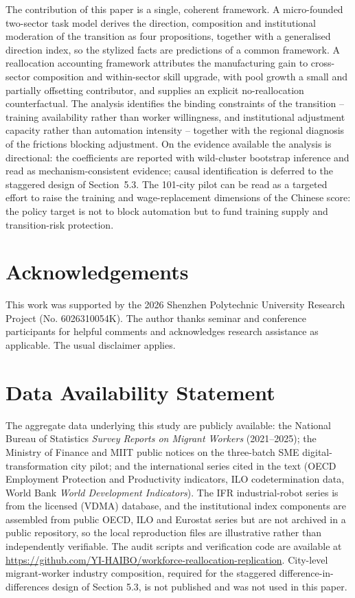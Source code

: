 \documentclass[12pt]{article}
\begin{document}
The contribution of this paper is a single, coherent framework. A micro-founded two-sector task model derives the direction, composition and institutional moderation of the transition as four propositions, together with a generalised direction index, so the stylized facts are predictions of a common framework. A reallocation accounting framework attributes the manufacturing gain to cross-sector composition and within-sector skill upgrade, with pool growth a small and partially offsetting contributor, and supplies an explicit no-reallocation counterfactual. The analysis identifies the binding constraints of the transition -- training availability rather than worker willingness, and institutional adjustment capacity rather than automation intensity -- together with the regional diagnosis of the frictions blocking adjustment. On the evidence available the analysis is directional: the coefficients are reported with wild-cluster bootstrap inference and read as mechanism-consistent evidence; causal identification is deferred to the staggered design of Section~5.3. The 101-city pilot can be read as a targeted effort to raise the training and wage-replacement dimensions of the Chinese score: the policy target is not to block automation but to fund training supply and transition-risk protection.

\section*{Acknowledgements}
This work was supported by the 2026 Shenzhen Polytechnic University Research Project (No. 6026310054K). The author thanks seminar and conference participants for helpful comments and acknowledges research assistance as applicable. The usual disclaimer applies.

\section*{Data Availability Statement}
The aggregate data underlying this study are publicly available: the National Bureau of Statistics \emph{Survey Reports on Migrant Workers} (2021--2025); the Ministry of Finance and MIIT public notices on the three-batch SME digital-transformation city pilot; and the international series cited in the text (OECD Employment Protection and Productivity indicators, ILO codetermination data, World Bank \emph{World Development Indicators}). The IFR industrial-robot series is from the licensed (VDMA) database, and the institutional index components are assembled from public OECD, ILO and Eurostat series but are not archived in a public repository, so the local reproduction files are illustrative rather than independently verifiable. The audit scripts and verification code are available at \url{https://github.com/YI-HAIBO/workforce-reallocation-replication}. City-level migrant-worker industry composition, required for the staggered difference-in-differences design of Section 5.3, is not published and was not used in this paper.
\end{document}
